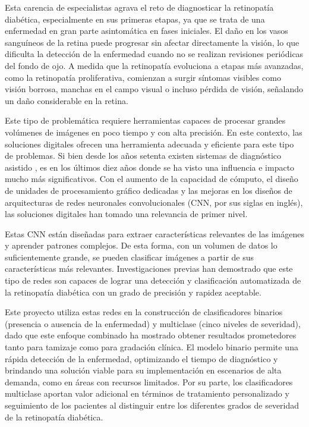 Esta carencia de especialistas agrava el reto de diagnosticar la retinopatía diabética, especialmente en sus primeras etapas, ya que se trata de una enfermedad en gran parte asintomática en fases iniciales. El daño en los vasos sanguíneos de la retina puede progresar sin afectar directamente la visión, lo que dificulta la detección de la enfermedad cuando no se realizan revisiones periódicas del fondo de ojo. A medida que la retinopatía evoluciona a etapas más avanzadas, como la retinopatía proliferativa, comienzan a surgir síntomas visibles como visión borrosa, manchas en el campo visual o incluso pérdida de visión, señalando un daño considerable en la retina.

Este tipo de problemática requiere herramientas capaces de procesar grandes volúmenes de imágenes en poco tiempo y con alta precisión. En este contexto, las soluciones digitales ofrecen una herramienta adecuada y eficiente para este tipo de problemas. Si bien desde los años setenta existen sistemas de diagnóstico asistido , es en los últimos diez años donde se ha visto una influencia e impacto mucho más significativos. Con el aumento de la capacidad de cómputo, el diseño de unidades de procesamiento gráfico dedicadas y las mejoras en los diseños de arquitecturas de redes neuronales convolucionales (CNN, por sus siglas en inglés), las soluciones digitales han tomado una relevancia de primer nivel.

Estas CNN están diseñadas para extraer características relevantes de las imágenes y aprender patrones complejos. De esta forma, con un volumen de datos lo suficientemente grande, se pueden clasificar imágenes a partir de sus características más relevantes. Investigaciones previas  han demostrado que este tipo de redes son capaces de lograr una detección y clasificación automatizada de la retinopatía diabética con un grado de precisión y rapidez aceptable.

Este proyecto utiliza estas redes en la construcción de clasificadores binarios (presencia o ausencia de la enfermedad) y multiclase (cinco niveles de severidad), dado que este enfoque combinado ha mostrado obtener resultados prometedores tanto para tamizaje como para gradación clínica. El modelo binario permite una rápida detección de la enfermedad, optimizando el tiempo de diagnóstico y brindando una solución viable para su implementación en escenarios de alta demanda, como en áreas con recursos limitados. Por su parte, los clasificadores multiclase aportan valor adicional en términos de tratamiento personalizado y seguimiento de los pacientes al distinguir entre los diferentes grados de severidad de la retinopatía diabética.


